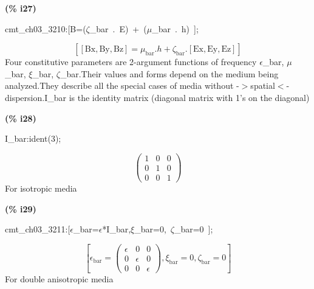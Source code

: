 \documentclass[fleqn]{article}
\begin{document}
\noindent
\begin{minipage}[t]{4.000000em}\color{red}\bfseries
(\% i27)	
\end{minipage}
\begin{minipage}[t]{\textwidth}\color{blue}
cmt\_ch03\_3210:[B=(\ensuremath{\zeta}\_bar\ .\ E)\ +\ (\ensuremath{\mu}\_bar\ .\ h)\ ];
\end{minipage}
\[\displaystyle \tag{cmt\_ ch03\_ 3210} 
\left[ \left[ \ensuremath{\mathrm{Bx}}\operatorname{,}\ensuremath{\mathrm{By}}\operatorname{,}\ensuremath{\mathrm{Bz}}\right] ={{\mu }_{\ensuremath{\mathrm{bar}}}}\ensuremath{\mathrm{ . }}h+{{\zeta }_{\ensuremath{\mathrm{bar}}}}\ensuremath{\mathrm{ . }}\left[ \ensuremath{\mathrm{Ex}}\operatorname{,}\ensuremath{\mathrm{Ey}}\operatorname{,}\ensuremath{\mathrm{Ez}}\right] \right] \mbox{}
\]
Four constitutive parameters are 2-argument functions of frequency \ensuremath{\epsilon}\_bar, \ensuremath{\mu}\_bar, \ensuremath{\xi}\_bar, \ensuremath{\zeta}\_bar.Their values and forms depend on the medium being analyzed.They describe all the special cases of media without  -\ensuremath{>}spatial\ensuremath{<}-  dispersion.I\_bar is the identity matrix (diagonal matrix with 1's on the diagonal)


\noindent
\begin{minipage}[t]{4.000000em}\color{red}\bfseries
(\% i28)	
\end{minipage}
\begin{minipage}[t]{\textwidth}\color{blue}
I\_bar:ident(3);
\end{minipage}
\[\displaystyle \tag{I\_ bar} 
\begin{pmatrix}1 & 0 & 0\\
0 & 1 & 0\\
0 & 0 & 1\end{pmatrix}\mbox{}
\]
For isotropic media


\noindent
\begin{minipage}[t]{4.000000em}\color{red}\bfseries
(\% i29)	
\end{minipage}
\begin{minipage}[t]{\textwidth}\color{blue}
cmt\_ch03\_3211:[\ensuremath{\epsilon}\_bar=\ensuremath{\epsilon}*I\_bar,\ensuremath{\xi}\_bar=0,\ \ensuremath{\zeta}\_bar=0\ ];
\end{minipage}
\[\displaystyle \tag{cmt\_ ch03\_ 3211} 
\left[ {{\epsilon }_{\ensuremath{\mathrm{bar}}}}=\begin{pmatrix}\epsilon  & 0 & 0\\
0 & \epsilon  & 0\\
0 & 0 & \epsilon \end{pmatrix}\operatorname{,}{{\xi }_{\ensuremath{\mathrm{bar}}}}=0\operatorname{,}{{\zeta }_{\ensuremath{\mathrm{bar}}}}=0\right] \mbox{}
\]
For double anisotropic media
\end{document}
